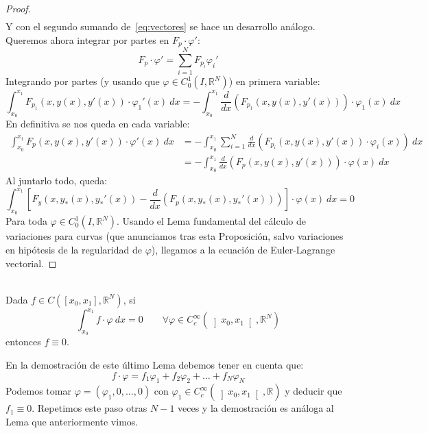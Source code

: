 \begin{prop}
\begin{proof}
\begin{multline*}
        \end{multline*}
        Y con el segundo sumando de~\eqref{eq:vectores} se hace un desarrollo análogo. Queremos ahora integrar por partes en $F_p\cdot \varphi'$:
        \begin{equation*}
            F_p\cdot \varphi' = \sum_{i=1}^{N} F_{p_i}\varphi_i'
        \end{equation*}
        Integrando por partes (y usando que $\varphi \in C_0^1(I,\mathbb{R}^N)$) en primera variable:
        \begin{equation*}
            \int_{x_0}^{x_1} F_{p_1}(x,y(x),y'(x))\cdot \varphi_1'(x)~dx = -\int_{x_0}^{x_1} \frac{d}{dx}\left(F_{p_1}(x,y(x),y'(x))\right)\cdot \varphi_1(x)~dx 
        \end{equation*}
        En definitiva se nos queda en cada variable:
        \begin{align*}
            \int_{x_0}^{x_1} F_p(x,y(x),y'(x))\cdot \varphi'(x)~dx &= -\int_{x_0}^{x_1} \sum_{i=1}^{N}\frac{d}{dx}(F_{p_i}(x,y(x),y'(x))\cdot \varphi_i(x))~dx  \\
                                                                   &= -\int_{x_0}^{x_1} \frac{d}{dx}(F_p(x,y(x),y'(x)))\cdot \varphi(x)~dx 
        \end{align*}
        Al juntarlo todo, queda:
        \begin{equation*}
            \int_{x_0}^{x_1} \left[F_y(x,y_\ast(x),y_\ast'(x)) - \frac{d}{dx}\left(F_p(x,y_\ast(x),y_\ast'(x))\right)\right]\cdot \varphi(x)~dx  = 0
        \end{equation*}
        Para toda $\varphi \in C_0^1(I,\mathbb{R}^N)$. Usando el Lema fundamental del cálculo de variaciones para curvas (que anunciamos tras esta Proposición, salvo variaciones en hipótesis de la regularidad de $\varphi$), llegamos a la ecuación de Euler-Lagrange vectorial.
    \end{proof}
\end{prop}

\begin{lema} \ \\
    Dada $f\in C([x_0,x_1],\mathbb{R}^N)$, si 
    \begin{equation*}
        \int_{x_0}^{x_{1}} f\cdot \varphi~dx  = 0 \qquad \forall \varphi \in C_c^\infty(\left]x_0,x_1\right[,\mathbb{R}^N)
    \end{equation*}
    entonces $f \equiv 0$.
\end{lema}
\noindent
En la demostración de este último Lema debemos tener en cuenta que:
\begin{equation*}
    f\cdot \varphi = f_1\varphi_1 + f_2\varphi_2 + \ldots + f_N\varphi_N
\end{equation*}
Podemos tomar $\varphi = (\varphi_1,0,\ldots,0)$ con $\varphi_1\in C_c^\infty(\left]x_0,x_1\right[,\mathbb{R})$ y deducir que $f_1\equiv 0$. Repetimos este paso otras $N-1$ veces y la demostración es análoga al Lema que anteriormente vimos.

